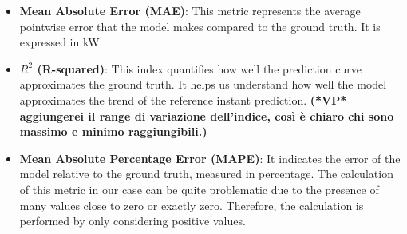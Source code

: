 \begin{itemize}
	\item \textbf{Mean Absolute Error (MAE)}: This metric represents the average pointwise error that the model makes compared to the ground truth. It is expressed in kW.
	\item \textbf{$R^2$ (R-squared)}: This index quantifies how well the prediction curve approximates the ground truth. It helps us understand how well the model approximates the trend of the reference instant prediction. {\bf (*VP* aggiungerei il range di variazione dell'indice, così è chiaro chi sono massimo e minimo raggiungibili.)}
	\item \textbf{Mean Absolute Percentage Error (MAPE)}\cite{metrics}: It indicates the error of the model relative to the ground truth, measured in percentage. The calculation of this metric in our case can be quite problematic due to the presence of many values close to zero or exactly zero. Therefore, the calculation is performed by only considering positive values.
\end{itemize}

\newpage






